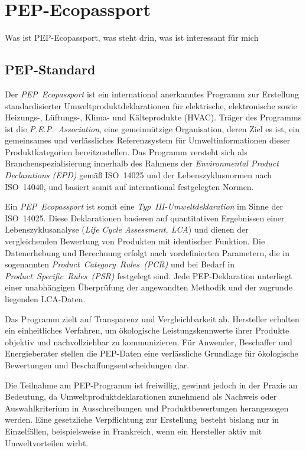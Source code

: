\section{PEP-Ecopassport}
Was ist PEP-Ecopassport, was steht drin, was ist interessant für mich

\subsection{PEP-Standard}

Der \emph{PEP~Ecopassport\textsuperscript{\textregistered}} ist ein international anerkanntes Programm zur Erstellung standardisierter Umweltproduktdeklarationen für elektrische, 
elektronische sowie Heizungs-, Lüftungs-, Klima- und Kälteprodukte (HVAC). Träger des Programms ist die \emph{P.E.P.~Association}, eine gemeinnützige
Organisation, deren Ziel es ist, ein gemeinsames und verlässliches Referenzsystem für Umweltinformationen dieser Produktkategorien bereitzustellen. 
Das Programm versteht sich als Branchenspezialisierung innerhalb des Rahmens der \emph{Environmental Product Declarations (EPD)} gemäß ISO~14025 und der 
Lebenszyklusnormen nach ISO~14040, und basiert somit auf international festgelegten Normen. \cite{PEP}

Ein \emph{PEP~Ecopassport} ist somit eine \emph{Typ~III-Umweltdeklaration} im Sinne der ISO~14025. Diese Deklarationen basieren auf quantitativen Ergebnissen einer
Lebenszyklusanalyse (\emph{Life Cycle Assessment, LCA}) und dienen der vergleichenden Bewertung von Produkten mit identischer Funktion. 
Die Datenerhebung und Berechnung erfolgt nach vordefinierten Parametern, die in sogenannten \emph{Product~Category~Rules~(PCR)} und bei Bedarf in 
\emph{Product~Specific~Rules~(PSR)} festgelegt sind. Jede PEP-Deklaration unterliegt einer unabhängigen Überprüfung der angewandten Methodik und der zugrunde liegenden LCA-Daten. \cite{Hassanzadeh2013}

Das Programm zielt auf Transparenz und Vergleichbarkeit ab. Hersteller erhalten ein einheitliches Verfahren, um ökologische Leistungskennwerte ihrer 
Produkte objektiv und nachvollziehbar zu kommunizieren. Für Anwender, Beschaffer und Energieberater stellen die PEP-Daten eine 
verlässliche Grundlage für ökologische Bewertungen und Beschaffungsentscheidungen dar.

Die Teilnahme am PEP-Programm ist freiwillig, gewinnt jedoch in der Praxis an Bedeutung, da Umweltproduktdeklarationen zunehmend als Nachweis 
oder Auswahlkriterium in Ausschreibungen und Produktbewertungen herangezogen werden. Eine gesetzliche Verpflichtung zur Erstellung besteht bislang nur in Einzelfällen, 
beispielsweise in Frankreich, wenn ein Hersteller aktiv mit Umweltvorteilen wirbt.

